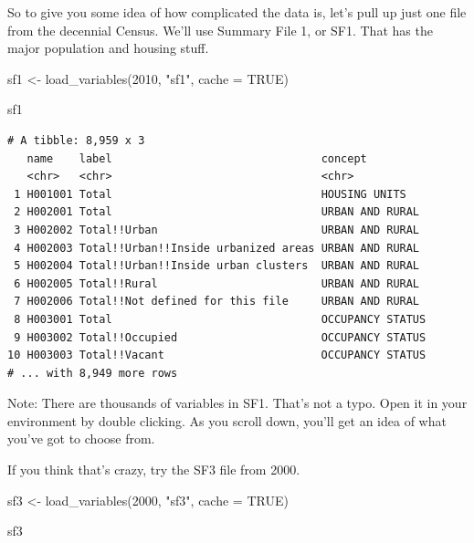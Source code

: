 \documentclass[
  letterpaper,
  DIV=11,
  numbers=noendperiod]{scrreprt}
\newenvironment{Shaded}{\begin{snugshade}}{\end{snugshade}}
\newcommand{\AttributeTok}[1]{\textcolor[rgb]{0.40,0.45,0.13}{#1}}
\newcommand{\ConstantTok}[1]{\textcolor[rgb]{0.56,0.35,0.01}{#1}}
\newcommand{\DecValTok}[1]{\textcolor[rgb]{0.68,0.00,0.00}{#1}}
\newcommand{\FunctionTok}[1]{\textcolor[rgb]{0.28,0.35,0.67}{#1}}
\newcommand{\NormalTok}[1]{\textcolor[rgb]{0.00,0.23,0.31}{#1}}
\newcommand{\OtherTok}[1]{\textcolor[rgb]{0.00,0.23,0.31}{#1}}
\newcommand{\StringTok}[1]{\textcolor[rgb]{0.13,0.47,0.30}{#1}}
\begin{document}
So to give you some idea of how complicated the data is, let's pull up
just one file from the decennial Census. We'll use Summary File 1, or
SF1. That has the major population and housing stuff.

\begin{Shaded}
\begin{Highlighting}[]
\NormalTok{sf1 }\OtherTok{\textless{}{-}} \FunctionTok{load\_variables}\NormalTok{(}\DecValTok{2010}\NormalTok{, }\StringTok{"sf1"}\NormalTok{, }\AttributeTok{cache =} \ConstantTok{TRUE}\NormalTok{)}

\NormalTok{sf1}
\end{Highlighting}
\end{Shaded}

\begin{verbatim}
# A tibble: 8,959 x 3
   name    label                                concept         
   <chr>   <chr>                                <chr>           
 1 H001001 Total                                HOUSING UNITS   
 2 H002001 Total                                URBAN AND RURAL 
 3 H002002 Total!!Urban                         URBAN AND RURAL 
 4 H002003 Total!!Urban!!Inside urbanized areas URBAN AND RURAL 
 5 H002004 Total!!Urban!!Inside urban clusters  URBAN AND RURAL 
 6 H002005 Total!!Rural                         URBAN AND RURAL 
 7 H002006 Total!!Not defined for this file     URBAN AND RURAL 
 8 H003001 Total                                OCCUPANCY STATUS
 9 H003002 Total!!Occupied                      OCCUPANCY STATUS
10 H003003 Total!!Vacant                        OCCUPANCY STATUS
# ... with 8,949 more rows
\end{verbatim}

Note: There are thousands of variables in SF1. That's not a typo. Open
it in your environment by double clicking. As you scroll down, you'll
get an idea of what you've got to choose from.

If you think that's crazy, try the SF3 file from 2000.

\begin{Shaded}
\begin{Highlighting}[]
\NormalTok{sf3 }\OtherTok{\textless{}{-}} \FunctionTok{load\_variables}\NormalTok{(}\DecValTok{2000}\NormalTok{, }\StringTok{"sf3"}\NormalTok{, }\AttributeTok{cache =} \ConstantTok{TRUE}\NormalTok{)}

\NormalTok{sf3}
\end{Highlighting}
\end{Shaded}
\end{document}
